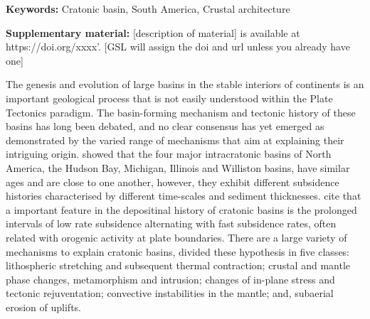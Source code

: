 \documentclass[paper,11pt]{geophysics}
\begin{document}
\bigskip 
\noindent \textbf{Keywords:} Cratonic basin, South America, Crustal architecture
\linebreak 
\linebreak 

\bigskip 
\textbf{Supplementary material:} [description of material] is available at https://doi.org/xxxx’. [GSL will assign the doi and url unless you already have one]
\linebreak 
\linebreak 

The genesis and evolution of large basins in the stable interiors of continents is an important geological process that is not easily understood within the Plate Tectonics paradigm. The basin-forming mechanism and tectonic history of these basins has long been debated, and no clear consensus has yet emerged as demonstrated by the varied range of mechanisms that aim at explaining their intriguing origin. \cite{kaminski_lithosphere_2000} showed that the four major intracratonic basins of North America, the Hudson Bay, Michigan, Illinois and Williston basins, have similar ages and are close to one another, however, they exhibit different subsidence histories characterised by different time-scales and sediment thicknesses. \cite{cloetingh_lithospheric_2011} cite that a important feature in the depositinal history of cratonic basins is the prolonged intervals of low rate subsidence alternating with fast subsidence rates, often related with orogenic activity at plate boundaries. There are a large variety of mechanisms to explain cratonic basins, \cite{hartley_interior_1994} divided these hypothesis in five classes: lithospheric stretching and subsequent thermal contraction; crustal and mantle phase changes, metamorphism and intrusion; changes of in-plane stress and tectonic rejuventation; convective instabilities in the mantle; and, subaerial erosion of uplifts. 
\end{document}

